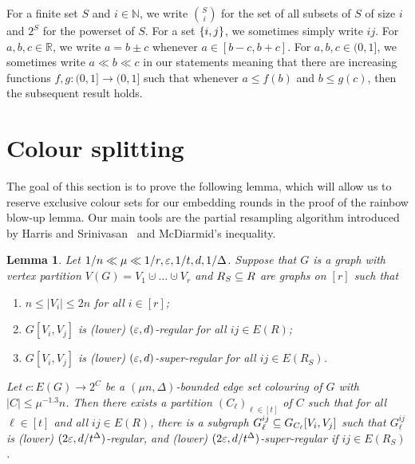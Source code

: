 \documentclass[10pt]{amsart}
\newtheorem{lemma}[algorithm]{Lemma}
\theoremstyle{definition}
\theoremstyle{claimstyle}
\theoremstyle{stepstyle}
\numberwithin{equation}{section}
\begin{document}
For a finite set $S$ and $i\in \mathbb{N}$,
we write $\binom{S}{i}$ for the set of all subsets of $S$ of size $i$
and $2^S$ for the powerset of $S$. 
For a set $\{i,j\}$, we sometimes simply write $ij$.
For $a,b,c\in \mathbb{R}$,
we write $a=b\pm c$ whenever $a\in [b-c,b+c]$.
For $a,b,c\in (0,1]$,
we sometimes write $a\ll b \ll c$ in our statements meaning that there are increasing functions $f,g:(0,1]\to (0,1]$
such that whenever $a\leq f(b)$ and $b \leq g(c)$,
then the subsequent result holds.





\section{Colour splitting} \label{sec:colour splitting}


The goal of this section is to prove the following lemma, which will allow us to reserve exclusive colour sets for our embedding rounds in the proof of the rainbow blow-up lemma.
Our main tools are the partial resampling algorithm introduced by Harris and Srinivasan~\cite{HS:18} and McDiarmid's inequality.


\begin{lemma} \label{lem:separate colours}
Let $1/n \ll \mu \ll 1/r,{\varepsilon}, 1/t,d,1/\Delta$. Suppose that $G$ is a graph with vertex partition $V(G)=V_1\cupdot\dots\cupdot V_r$ and $R_S\subseteq R$ are graphs on $[r]$ such that
\begin{enumerate}[label={\rm (\roman*)}]
	\item $n\le |V_i|\le 2n$ for all $i\in[r]$;
	\item $G[V_i,V_j]$ is (lower) $({\varepsilon},d)$-regular for all $ij\in E(R)$;
	\item $G[V_i,V_j]$ is (lower) $({\varepsilon},d)$-super-regular for all $ij\in E(R_S)$.
\end{enumerate}
Let $c\colon E(G)\to 2^C$ be a $(\mu n,\Delta)$-bounded edge set colouring of $G$ with $|C|\le \mu^{-1.3}n$.
Then there exists a partition $(C_\ell)_{\ell\in [t]}$ of $C$ such that for all $\ell \in [t]$ and all $ij \in E(R)$, there is a subgraph $G_\ell^{ij}\subseteq G_{C_\ell}[V_i,V_j]$ such that $G_\ell^{ij}$ is (lower) $(2{\varepsilon},d/t^\Delta)$-regular, and (lower) $(2{\varepsilon},d/t^\Delta)$-super-regular if $ij \in E(R_S)$.
\end{lemma}
\end{document}
